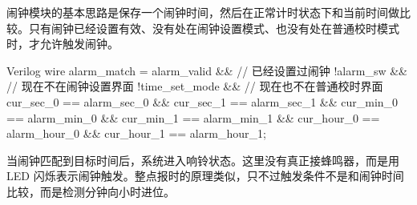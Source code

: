 \documentclass[12pt,a4paper,UTF8]{ctexart}
\begin{document}
闹钟模块的基本思路是保存一个闹钟时间，然后在正常计时状态下和当前时间做比较。只有闹钟已经设置有效、没有处在闹钟设置模式、也没有处在普通校时模式时，才允许触发闹钟。

\begin{codeblock}{Verilog}
wire alarm_match =
    alarm_valid &&          // 已经设置过闹钟
    !alarm_sw &&            // 现在不在闹钟设置界面
    !time_set_mode &&       // 现在也不在普通校时界面
    cur_sec_0  == alarm_sec_0  &&
    cur_sec_1  == alarm_sec_1  &&
    cur_min_0  == alarm_min_0  &&
    cur_min_1  == alarm_min_1  &&
    cur_hour_0 == alarm_hour_0 &&
    cur_hour_1 == alarm_hour_1;
\end{codeblock}

当闹钟匹配到目标时间后，系统进入响铃状态。这里没有真正接蜂鸣器，而是用 LED 闪烁表示闹钟触发。整点报时的原理类似，只不过触发条件不是和闹钟时间比较，而是检测分钟向小时进位。




\end{document}
